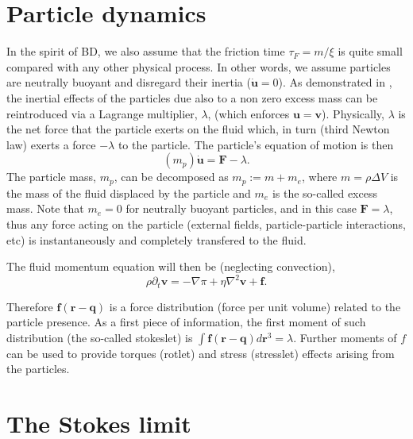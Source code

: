 \documentclass[ twoside,openright,titlepage,numbers=noenddot,%
headinclude,footinclude,cleardoublepage=empty,abstract=on,
BCOR=5mm,paper=a4,fontsize=11pt, dvipsnames
]{scrreprt}
\renewcommand{\vec}[1]{\bm{#1}}
\newcommand{\ppos}{q}
\newcommand{\pvel}{u}
\newcommand{\fpos}{r}
\newcommand{\fvel}{v}
\begin{document}
\section*{Particle dynamics}
In the spirit of \gls{BD}, we also assume that the friction time $\tau_F = m/\xi$ is quite small compared with any other physical process. In other words, we assume particles are neutrally buoyant and disregard their inertia ($\dot{\vec{\pvel}} = 0$). As demonstrated in \cite{Balboa2014}, the inertial effects of the particles due also to a non zero excess mass can be reintroduced via a Lagrange multiplier, $\lambda$, (which enforces $\vec{\pvel} = \vec{\fvel}$). Physically, $\lambda$ is the net force that the particle exerts on the fluid which, in turn (third Newton law) exerts a force $-\lambda$ to the particle. The particle's equation of motion is then
\begin{equation}
  \label{eq:inertiallagrande}
(m_p) \dot{\vec{\pvel}} = \vec{F} - \lambda.
\end{equation}
The particle mass, $m_p$, can be decomposed as $m_p := m + m_e$, where $m=\rho\Delta V$ is the mass of the fluid displaced by the particle and $m_e$ is the so-called excess mass. Note that $m_e=0$ for neutrally buoyant particles, and in this case $\vec{F} = \lambda$, thus any force acting on the particle (external fields, particle-particle interactions, etc) is instantaneously and completely transfered to the fluid.


The fluid momentum equation will then be (neglecting convection),
\begin{equation}
\rho \partial_t\vec{\fvel} = -\nabla \pi + \eta \nabla^2\vec{\fvel} + \vec{f}.
\end{equation}

Therefore $\vec{f(\vec{\fpos}-\vec{\ppos})}$ is a force distribution (force per unit volume) related to the particle presence. As a first piece of information, the first moment of such distribution (the so-called stokeslet) is $\int\vec{f(\vec{\fpos}-\vec{\ppos})}d\vec{\fpos}^3 = \lambda$. Further moments of $f$ can be used to provide torques (rotlet) and stress (stresslet) effects arising from the particles.

\section*{The Stokes limit}
\end{document}
